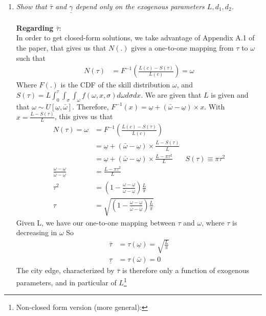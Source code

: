 \documentclass[10pt, final]{article}
\begin{document}
\begin{enumerate}[1.]
    \item \textit{Show that $\bar{\tau}$ and $\underline{\gamma}$ depend only on the exogenous parameters $L, d_1, d_2$. }\\
    \\
    \textbf{Regarding $\bar{\tau}$}:
    \\
    In order to get closed-form solutions, we take advantage of Appendix A.1 of the paper, that gives us that $N(.)$ gives a one-to-one mapping from $\tau$ to $\omega$ such that
    \begin{align*}
        N(\tau) &= F^{-1}(\frac{L(c) - S(\tau)}{L(c)}) = \omega
    \end{align*}
    Where $F(.)$ is the CDF of the skill distribution $\omega$, and $S(\tau) = L \int_0^{\tau} \int_{\sigma} \int_{\omega} f(\omega, x, \sigma) d\omega d\sigma dx$. We are given that $L$ is given and that $\omega \sim U[\underline{\omega}, \bar{\omega}]$. Therefore, $F^{-1}(x) = \underline{\omega} + (\bar{\omega} - \underline{\omega}) \times x$. With $x = \frac{L - S(\tau)}{L}$, this gives us that
    \begin{align*}
        N(\tau) = \omega &= F^{-1}(\frac{L(c) - S(\tau)}{L(c)}) \\
        &= \underline{\omega} + (\bar{\omega} - \underline{\omega}) \times \frac{L - S(\tau)}{L} \\
        &= \underline{\omega} + (\bar{\omega} - \underline{\omega}) \times \frac{L - \pi \tau^2}{L} & S(\tau) \equiv \pi \tau^2 \\
        \frac{\omega - \underline{\omega}}{\bar{\omega} - \underline{\omega}} &= \frac{ L - \pi \tau^2}{L} \\
        \tau^2 &= (1 - \frac{\omega - \underline{\omega}}{\bar{\omega} - \underline{\omega}}) \frac{L}{\pi}  \\
        \tau &= \sqrt{(1 - \frac{\omega - \underline{\omega}}{\bar{\omega} - \underline{\omega}}) \frac{L}{\pi}}
    \end{align*}
    Given L, we have our one-to-one mapping between $\tau$ and $\omega$, where $\tau$ is decreasing in $\omega$ So
    \begin{align*}
        \bar{\tau} &= \tau(\underline{\omega}) = \sqrt{\frac{L}{\pi}} \\
        \underline{\tau} &= \tau(\bar{\omega}) = 0
    \end{align*}
    The city edge, characterized by $\bar{\tau}$ is therefore only a function of exogenous parameters, and in particular of $L$\footnote{Non-closed form version (more general):
}
\end{enumerate}
\end{document}

